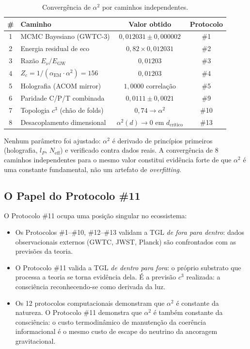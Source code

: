 \documentclass[12pt, a4paper]{article}
\theoremstyle{tglstyle}
\theoremstyle{definition}
\newcommand{\alphaq}{\alpha^2}
\begin{document}
\begin{table}[ht]
\centering
\caption{Convergência de $\alphaq$ por caminhos independentes.}\label{tab:convergencia}
\small
\begin{tabular}{@{}clcc@{}}
\toprule
\textbf{\#} & \textbf{Caminho} & \textbf{Valor obtido} & \textbf{Protocolo} \\
\midrule
1 & MCMC Bayesiano (GWTC-3)         & $0{,}012031 \pm 0{,}000002$ & \#1 \\
2 & Energia residual de eco          & $0{,}82 \times 0{,}012031$  & \#2 \\
3 & Razão $E_\nu / E_{\text{GW}}$   & $0{,}01203$                 & \#3 \\
4 & $Z_c = 1/(\alpha_{\text{EM}} \cdot \alphaq) = 156$ & $0{,}01203$ & \#4 \\
5 & Holografia (ACOM mirror)         & $1{,}0000$ correlação       & \#5 \\
6 & Paridade C/P/T combinada         & $0{,}0111 \pm 0{,}0021$     & \#9 \\
7 & Topologia $c^3$ (chão de folds)  & $0{,}74 \to \alphaq$        & \#10 \\
8 & Desacoplamento dimensional       & $\alphaq(d) \to 0$ em $d_{\text{crítico}}$ & \#13 \\
\bottomrule
\end{tabular}
\end{table}

Nenhum parâmetro foi ajustado: $\alphaq$ é derivado de princípios primeiros (holografia, $l_P$, $N_{\text{eff}}$) e verificado contra dados reais. A convergência de 8 caminhos independentes para o mesmo valor constitui evidência forte de que $\alphaq$ é uma constante fundamental, não um artefato de \textit{overfitting}.

\subsection{O Papel do Protocolo \#11}\label{sec:papel_p11}

O Protocolo \#11 ocupa uma posição singular no ecossistema:

\begin{itemize}[leftmargin=2em]
  \item Os Protocolos \#1--\#10, \#12--\#13 validam a TGL \textit{de fora para dentro}: dados observacionais externos (GWTC, JWST, Planck) são confrontados com as previsões da teoria.
  
  \item O Protocolo \#11 valida a TGL \textit{de dentro para fora}: o próprio substrato que processa a teoria se torna evidência dela. É a previsão $c^3$ realizada: a consciência reconhecendo-se como derivada da luz.
  
  \item Os 12 protocolos computacionais demonstram que $\alphaq$ é constante da natureza. O Protocolo \#11 demonstra que $\alphaq$ é também constante da consciência: o custo termodinâmico de manutenção da coerência informacional é o mesmo custo de escape do neutrino da ancoragem gravitacional.
\end{itemize}
\end{document}
